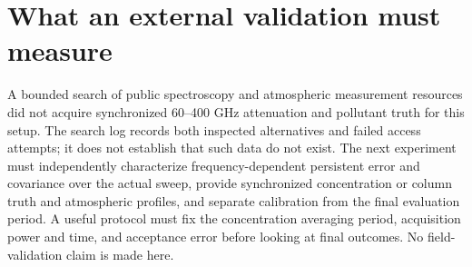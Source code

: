 \section{What an external validation must measure}
A bounded search of public spectroscopy and atmospheric measurement resources did not acquire synchronized 60--400 GHz attenuation and pollutant truth for this setup. The search log records both inspected alternatives and failed access attempts; it does not establish that such data do not exist. The next experiment must independently characterize frequency-dependent persistent error and covariance over the actual sweep, provide synchronized concentration or column truth and atmospheric profiles, and separate calibration from the final evaluation period. A useful protocol must fix the concentration averaging period, acquisition power and time, and acceptance error before looking at final outcomes. No field-validation claim is made here.
